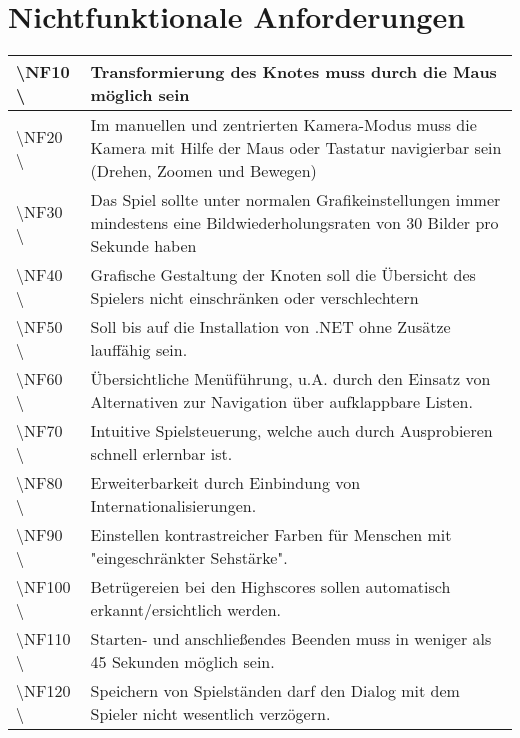 \chapter{Nichtfunktionale Anforderungen}

\begin{tabular}{|p{}|p{}|}
\hline 
\textbackslash NF10  \textbackslash & Transformierung des Knotes muss durch die Maus möglich sein\\ %
\hline 
\textbackslash NF20  \textbackslash & Im manuellen und zentrierten Kamera-Modus muss die Kamera mit Hilfe der Maus oder Tastatur navigierbar sein (Drehen, Zoomen und Bewegen)\\ %
\hline 
\textbackslash NF30  \textbackslash & Das Spiel sollte unter normalen Grafikeinstellungen immer mindestens eine Bildwiederholungsraten von 30 Bilder pro Sekunde haben\\ 
\hline 
\textbackslash NF40  \textbackslash & Grafische Gestaltung der Knoten soll die Übersicht des Spielers nicht einschränken oder verschlechtern\\ 
\hline 
\textbackslash NF50  \textbackslash & Soll bis auf die Installation von .NET ohne Zusätze lauffähig sein.\\ 
\hline 
\textbackslash NF60  \textbackslash & Übersichtliche Menüführung, u.A. durch den Einsatz von Alternativen zur Navigation über aufklappbare Listen.\\ %
\hline 
\textbackslash NF70  \textbackslash & Intuitive Spielsteuerung, welche auch durch Ausprobieren schnell erlernbar ist.\\ 
\hline 
\textbackslash NF80  \textbackslash & Erweiterbarkeit durch Einbindung von Internationalisierungen.\\ %
\hline 
\textbackslash NF90  \textbackslash & Einstellen kontrastreicher Farben für Menschen mit "eingeschränkter Sehstärke".\\ 
\hline
\textbackslash NF100  \textbackslash & Betrügereien bei den Highscores sollen automatisch erkannt/ersichtlich werden.\\ 
\hline 
\textbackslash NF110  \textbackslash & Starten- und anschließendes Beenden muss in weniger als 45 Sekunden möglich sein.\\ %
\hline
\textbackslash NF120  \textbackslash & Speichern von Spielständen darf den Dialog mit dem Spieler nicht wesentlich verzögern.\\ %
\hline
\end{tabular} 
